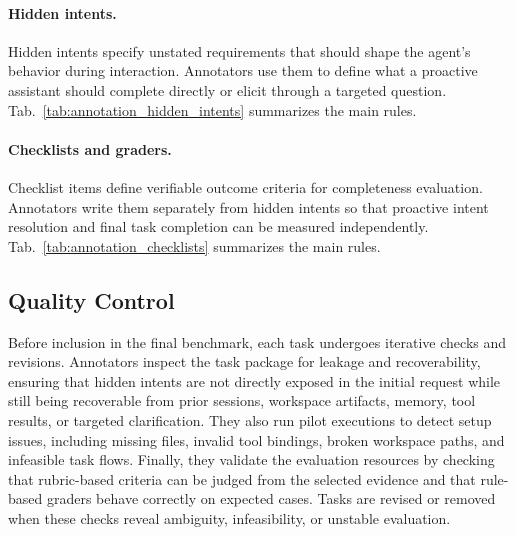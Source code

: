 \paragraph{Hidden intents.}
Hidden intents specify unstated requirements that should shape the agent's behavior during interaction. Annotators use them to define what a proactive assistant should complete directly or elicit through a targeted question. Tab.~\ref{tab:annotation_hidden_intents} summarizes the main rules.



\paragraph{Checklists and graders.}
Checklist items define verifiable outcome criteria for completeness evaluation. Annotators write them separately from hidden intents so that proactive intent resolution and final task completion can be measured independently. Tab.~\ref{tab:annotation_checklists} summarizes the main rules.



\subsection{Quality Control}
\label{app:data_quality_control}

Before inclusion in the final benchmark, each task undergoes iterative checks and revisions. Annotators inspect the task package for leakage and recoverability, ensuring that hidden intents are not directly exposed in the initial request while still being recoverable from prior sessions, workspace artifacts, memory, tool results, or targeted clarification. They also run pilot executions to detect setup issues, including missing files, invalid tool bindings, broken workspace paths, and infeasible task flows. Finally, they validate the evaluation resources by checking that rubric-based criteria can be judged from the selected evidence and that rule-based graders behave correctly on expected cases. Tasks are revised or removed when these checks reveal ambiguity, infeasibility, or unstable evaluation.